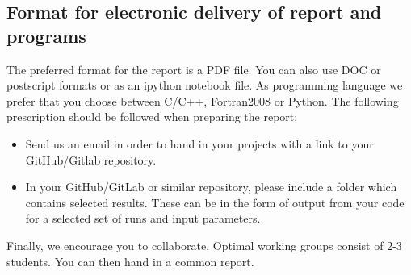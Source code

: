 \documentclass[%
oneside,                 %
final,                   %
10pt]{article}
\begin{document}
\noindent
\subsection{Format for electronic delivery of report and programs}

The preferred format for the report is a PDF file. You can also use DOC or postscript formats or as an ipython notebook file.  As programming language we prefer that you choose between C/C++, Fortran2008 or Python. The following prescription should be followed when preparing the report:

\begin{itemize}
  \item Send us an email in order  to hand in your projects with a link to your GitHub/Gitlab repository.

  \item In your GitHub/GitLab or similar repository, please include a folder which contains selected results. These can be in the form of output from your code for a selected set of runs and input parameters.
\end{itemize}

\noindent
Finally, 
we encourage you to collaborate. Optimal working groups consist of 
2-3 students. You can then hand in a common report. 



\end{document}
